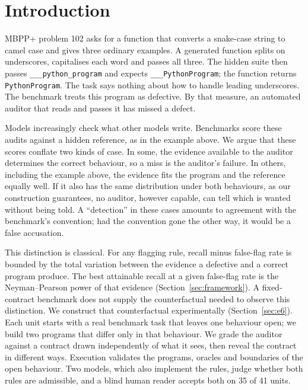 \section{Introduction}
\label{sec:intro}

MBPP+ problem 102 \citep{liu2023evalplus} asks for a function that converts a snake-case string to camel case and
gives three ordinary examples. A generated function splits on underscores, capitalises each word and passes
all three. The hidden suite then passes \verb|___python_program| and expects \verb|___PythonProgram|; the function
returns \verb|PythonProgram|. The task says nothing about how to handle leading underscores. The benchmark treats
this program as defective. By that measure, an automated auditor that reads and passes it has missed a defect.

Models increasingly check what other models write. Benchmarks score these audits against a hidden reference,
as in the example above. We argue that these scores conflate two kinds of case. In some, the evidence available
to the auditor determines the correct behaviour, so a miss is the auditor's failure. In others, including the
example above, the evidence fits the program and the reference equally well. If it also has the same distribution
under both behaviours, as our construction guarantees, no auditor, however capable, can tell which is wanted
without being told. A ``detection'' in these cases amounts to agreement with the benchmark's convention;
had the convention gone the other way, it would be a false accusation.

This distinction is classical. For any flagging rule, recall minus false-flag rate is bounded by the total
variation between the evidence a defective and a correct program produce. The best attainable recall at a given
false-flag rate is the Neyman--Pearson power of that evidence (Section~\ref{sec:framework}). A fixed-contract benchmark
does not supply the counterfactual needed to observe this distinction.
We construct that counterfactual experimentally (Section~\ref{sec:e6}). Each unit starts with a real benchmark task
that leaves one behaviour open; we build two programs that differ only in that behaviour. We grade the auditor against a
contract drawn independently of what it sees, then reveal the contract in different ways. Execution validates the
programs, oracles and boundaries of the open behaviour. Two models, which also implement the rules, judge whether both
rules are admissible, and a blind human reader accepts both on 35 of 41 units.

